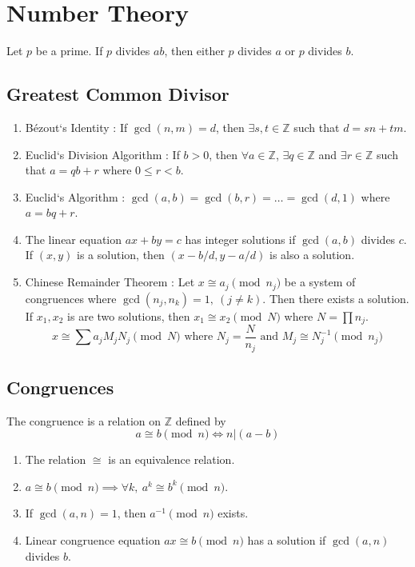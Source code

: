 \chapter{Number Theory}
\begin{lemma}[Euclid]
	Let $p$ be a prime. If $p$ divides $ab$, then either $p$ divides $a$ or $p$ divides $b$.
\end{lemma}

\section{Greatest Common Divisor}
\begin{enumerate}
	\item B\'ezout`s Identity : If $\gcd(n,m)= d$, then $\exists s,t \in \mathbb{Z}$ such that $d = sn+tm$.
	\item Euclid`s Division Algorithm : If $b > 0$, then $\forall a \in \mathbb{Z}$, $\exists q \in \mathbb{Z}$ and $\exists r \in \mathbb{Z}$ such that $a = qb+r$ where $0 \le r < b$.
	\item Euclid`s Algorithm : $\gcd(a,b) = \gcd(b,r) = \dots = \gcd(d,1)$ where $a = bq+r$.
	\item The linear equation $ax+by=c$ has integer solutions if $\gcd(a,b)$ divides $c$.\\ If $(x,y)$ is a solution, then $(x-b/d,y-a/d)$ is also a solution.
	\item Chinese Remainder Theorem : Let $x \cong a_j \pmod{n_j}$ be a system of congruences where $\gcd(n_j,n_k) = 1,\ (j \ne k)$. Then there exists a solution.\\ If $x_1,x_2$ is are two solutions, then $x_1 \cong x_2 \pmod{N}$ where $N = \prod n_j$.
		$$x \cong \sum a_j M_j N_j \pmod{N} \text{ where } N_j = \frac{N}{n_j} \text{ and } M_j \cong N_j^{-1} \pmod{n_j}$$
\end{enumerate}

\section{Congruences}
\begin{definition}
	The congruence is a relation on $\mathbb{Z}$ defined by
	$$a \cong b \pmod{n} \iff n | (a-b)$$
\end{definition}
\begin{enumerate}
	\item The relation $\cong$ is an equivalence relation.
	\item $a \cong b \pmod{n} \implies \forall k,\ a^k \cong b^k \pmod{n}$.
	\item If $\gcd(a,n) = 1$, then $a^{-1} \pmod{n}$ exists.
	\item Linear congruence equation $ax \cong b \pmod{n}$ has a solution if $\gcd(a,n)$ divides $b$.
\end{enumerate}

